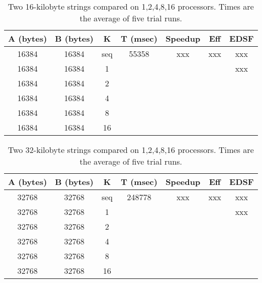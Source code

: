 \begin{table}[h]
	\begin{center}
		\begin{tabular}{ | c | c | c | c | c | c | c |}
			\hline 
			A (bytes)&	B (bytes) &	K	&	T (msec)	&	Speedup	&	Eff	&	EDSF \\
			\hline		
			16384   &	16384   &	seq	&	55358		&	xxx		&	xxx	&	xxx \\
			16384  	&	16384  	&	1	&	 	 		&			&		&	xxx \\
			16384  	&	16384  	&	2	&	 	 	 	&			&		&\\
			16384  	&	16384  	&	4	&	 	 	 	&			&		&\\
			16384  	&	16384  	&	8	&	 	 	 	&			&		&\\
			16384  	&	16384  	&	16	&	 	 	 	&			&		&\\
			\hline
		\end{tabular}
	\end{center}
	\caption{Two 16-kilobyte strings compared on {1,2,4,8,16} processors. Times are the average of five trial runs.}
\end{table}


\begin{table}[h]
	\begin{center}
		\begin{tabular}{ | c | c | c | c | c | c | c |}
			\hline 
			A (bytes)&	B (bytes) &	K	&	T (msec)	&	Speedup	&	Eff	&	EDSF \\
			\hline		
			32768   &	32768   &	seq	&	248778		&	xxx		&	xxx	&	xxx \\
			32768  	&	32768  	&	1	&	 	 		&			&		&	xxx \\
			32768  	&	32768  	&	2	&	 	 	 	&			&		&\\
			32768  	&	32768  	&	4	&	 	 	 	&			&		&\\
			32768  	&	32768  	&	8	&	 	 	 	&			&		&\\
			32768  	&	32768  	&	16	&	 	 	 	&			&		&\\
			\hline
		\end{tabular}
	\end{center}
	\caption{Two 32-kilobyte strings compared on {1,2,4,8,16} processors. Times are the average of five trial runs.}
\end{table}



